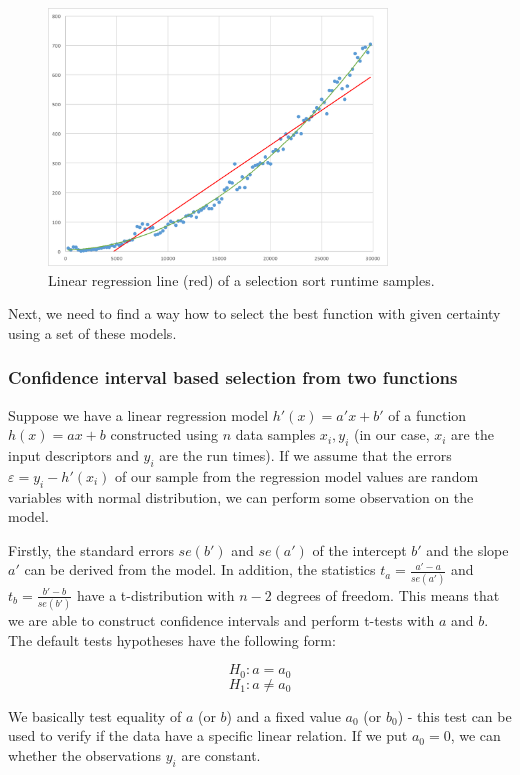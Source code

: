\begin{figure}[h!]
	\captionsetup{justification=centering,margin=0.5cm}
	\centerline{\mbox{\includegraphics[width=90mm]{./img/selection_sort_linear_trendline.png}}}
	\caption{Linear regression line (red) of a selection sort runtime samples.}
	\label{fig:selection_sort_linear_trendline}
\end{figure}

Next, we need to find a way how to select the best function with given certainty using a set of these models.

\subsubsection{Confidence interval based selection from two functions}
\label{subsubsec:confidence_interval_selection}

Suppose we have a linear regression model \(h'(x) = a' x + b'\) of a function $h(x) = ax + b$ constructed using \(n\) data samples \(x_i, y_i\) (in our case, \(x_i\) are the input descriptors and \(y_i\) are the run times). If we assume that the errors $\varepsilon = y_i - h'(x_i)$ of our sample from the regression model values are random variables with normal distribution, we can perform some observation on the model.

Firstly, the standard errors $se(b')$ and $se(a')$ of the intercept $b'$ and the slope $a'$ can be derived from the model. In addition, the statistics $t_a = \frac{a' - a}{se(a')}$ and $t_b = \frac{b' - b}{se(b')}$ have a t-distribution with $n-2$ degrees of freedom. This means that we are able to construct confidence intervals and perform t-tests with $a$ and $b$. The default tests hypotheses have the following form:

\[H_0: a = a_0\]
\[H_1: a \neq a_0 \]

We basically test equality of $a$ (or $b$) and a fixed value $a_0$ (or $b_0$) - this test can be used to verify if the data have a specific linear relation. If we put $a_0 = 0$, we can whether the observations $y_i$ are constant. 

